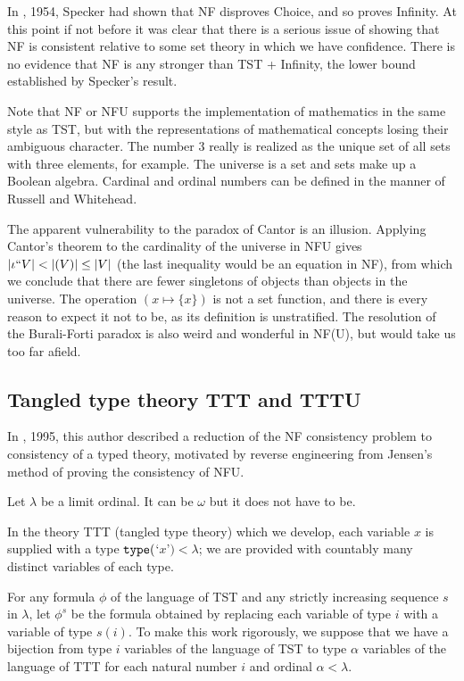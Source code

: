 \documentclass[112pt]{article}
\begin{document}
In \cite{notac}, 1954, Specker had shown that NF disproves Choice, and so proves Infinity.  At this point if not before it was clear that there is a serious issue of showing that NF is consistent relative to some set theory in which we have confidence.  There is no evidence that NF is any stronger than TST + Infinity, the lower bound established by Specker's result.

Note that NF or NFU supports the implementation of mathematics in the same style as TST, but with the representations of mathematical concepts losing their ambiguous character.  The number 3 really is realized as the unique set of all sets with three elements, for example.  The universe is a set and sets make up a Boolean algebra.   Cardinal and ordinal numbers can be defined
in the manner of Russell and Whitehead.

The apparent vulnerability to the paradox of Cantor is an illusion.  Applying Cantor's theorem to the cardinality of the universe in NFU gives $|\iota``V| < |{\cal }(V)| \leq |V|$ (the last inequality would be an equation in NF), from which we conclude that there are fewer singletons of objects than objects in the universe.  The operation $(x \mapsto \{x\})$ is not a set function, and there is every reason to expect it not to be, as its definition is unstratified.  The resolution of the Burali-Forti paradox is also weird and wonderful in NF(U), but would take us too far afield.

\newpage

\subsection{Tangled type theory TTT and TTTU}

In \cite{tangled}, 1995, this author described a reduction of the NF consistency problem to consistency of a typed theory,  motivated by reverse engineering from Jensen's method of proving the consistency of NFU.

Let $\lambda$ be a limit ordinal.  It can be $\omega$ but it does not have to be.  

In the theory TTT (tangled type theory) which we develop, each variable $x$ is supplied with a type ${\tt type}($`$x$'$) <\lambda$;  we are provided with countably many distinct variables of each type.

For any formula $\phi$ of the language of TST and any strictly increasing sequence $s$ in $\lambda$, let $\phi^s$ be the formula obtained by replacing each variable
of type $i$ with a variable of type $s(i)$.  To make this work rigorously, we suppose that we have a bijection from type $i$ variables of the language of TST to type $\alpha$ variables
of the language of TTT for each natural number $i$ and ordinal $\alpha<\lambda$.
\end{document}
